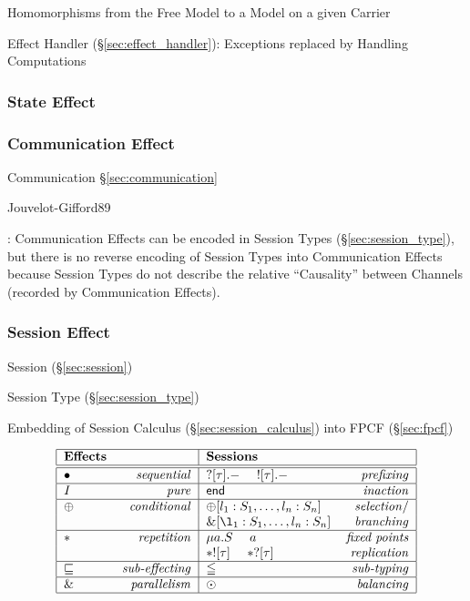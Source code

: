 Homomorphisms from the Free Model to a Model on a given Carrier

Effect Handler (\S\ref{sec:effect_handler}): Exceptions replaced by
Handling Computations



\subsubsection{State Effect}\label{sec:state_effect}

\subsubsection{Communication Effect}\label{sec:communication_effect}

Communication \S\ref{sec:communication}

Jouvelot-Gifford89

\cite{nielson-nielson99}

\cite{orchard-yoshida16}: Communication Effects can be encoded in
Session Types (\S\ref{sec:session_type}), but there is no reverse
encoding of Session Types into Communication Effects because Session
Types do not describe the relative ``Causality'' between Channels
(recorded by Communication Effects).



\subsubsection{Session Effect}\label{sec:session_effect}

Session (\S\ref{sec:session})

Session Type (\S\ref{sec:session_type})

Embedding of Session Calculus (\S\ref{sec:session_calculus}) into FPCF
(\S\ref{sec:fpcf})

\[
  \begin{tabular}{|l r|l r|}
    \hline \textbf{Effects} & & \textbf{Sessions} & \\
    \hline \hline
      $\bullet$ & \emph{sequential}
        & $?[\tau].-$ \quad $![\tau].-$ & \emph{prefixing} \\
    \hline
      $I$ & \emph{pure} & $\mathsf{end}$ & \emph{inaction} \\
    \hline
      $\oplus$ & \emph{conditional}
        & $\oplus[l_1:S_1, \ldots, l_n:S_n]$ & \emph{selection}/ \\
      \hfill & \hfill
        & $\&[\l_1:S_1, \ldots, l_n:S_n]$ & \emph{branching} \\
    \hline
      $*$ & \emph{repetition}
        & $\mu a.S$ \quad $a$ & \emph{fixed points} \\
      \hfil & \hfill
        & $*![\tau]$ \quad $*?[\tau]$ & \emph{replication} \\
    \hline
      $\sqsubseteq$ & \emph{sub-effecting}
        & $\leqq$ & \emph{sub-typing} \\
    \hline
      $\&$ & \emph{parallelism} & $\odot$ & \emph{balancing} \\
    \hline
  \end{tabular}
\]


